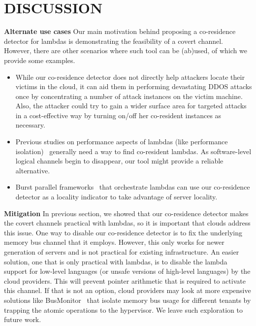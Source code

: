 \section{DISCUSSION}
\label{sec:discussion}
\textbf{Alternate use cases}
Our main motivation behind proposing a co-residence detector for lambdas is
demonstrating the feasibility of a covert channel. However, there are other
scenarios where such tool can be (ab)used, of which we provide some examples. 
\begin{itemize}
    \item While our co-residence detector does not directly help attackers
    locate their victims in the cloud, it can aid them in performing devastating 
    DDOS attacks once by concentrating a number of attack instances on the victim 
    machine. Also, the attacker could try to gain a wider surface area for 
    targeted attacks in a cost-effective way by turning on/off her co-resident 
    instances as necessary. 
    \item Previous studies on performance aspects of lambdas (like performance 
    isolation)~\cite{wangusenix2018} generally need a way to find co-resident
    lambdas. As software-level logical channels begin to disappear, our tool 
    might provide a reliable alternative.
    \item Burst parallel frameworks~\cite{234886} that orchestrate lambdas can
    use our co-residence detector as a locality indicator to take advantage of
    server locality.
\end{itemize}

\textbf{Mitigation}
In previous section, we showed that our co-residence detector makes the covert
channels practical with lambdas, so it is important that clouds address this
issue. One way to disable our co-residence detector is to fix the underlying
memory bus channel that it employs. However, this only works for newer
generation of servers and is not practical for existing infrastructure. An
easier solution, one that is only practical with lambdas, is to disable the
lambda support for low-level languages (or unsafe versions of high-level
languages) by the cloud providers. This will prevent pointer arithmetic that is
required to activate this channel. If that is not an option, cloud providers may look at
more expensive solutions like BusMonitor~\cite{MemoryBusMitigation} that isolate
memory bus usage for different tenants by trapping the atomic operations to the 
hypervisor. We leave such exploration to future
work.
